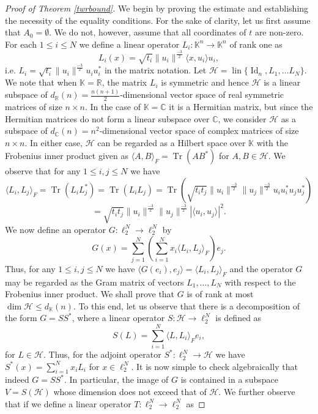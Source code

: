 \documentclass[12pt, reqno]{amsart}
\theoremstyle{definition}
\theoremstyle{remark}
\numberwithin{equation}{section}
\DeclareMathOperator{\lin}{lin}
\DeclareMathOperator{\tr}{Tr}
\DeclareMathOperator{\id}{Id}
\begin{document}
\begin{proof}[Proof of Theorem \ref{twrbound}]
We begin by proving the estimate and establishing the necessity of the equality conditions. For the sake of clarity, let us first assume that $A_0=\emptyset$. We do not, however, assume that all coordinates of $t$ are non-zero. For each $1 \leq i \leq N$ we define a linear operator $L_i: \mathbb{K}^n \to \mathbb{K}^n$ of rank one as
$$L_i(x) = \sqrt{t_i} \|u_i\|^{\frac{-3}{2}} \langle x, u_i \rangle u_i,$$
i.e. $L_i = \sqrt{t_i} \|u_i\|^{\frac{-3}{2}} u_iu_i^{*}$ in the matrix notation. Let $\mathcal{H} = \lin \{\id_n, L_1, \ldots L_N \}$. We note that when $\mathbb K=\mathbb R$, the matrix $L_i$ is symmetric and hence $\mathcal{H}$ is a linear subspace of $d_{\mathbb{R}}(n)=\frac{n(n+1)}{2}$-dimensional vector space of real symmetric matrices of size $n \times n$. In the case of $\mathbb{K}=\mathbb{C}$ it is a Hermitian matrix, but since the Hermitian matrices do not form a linear subspace over $\mathbb{C}$, we consider $\mathcal{H}$ as a subspace of $d_{\mathbb{C}}(n)=n^2$-dimensional vector space of complex matrices of size $n \times n$. In either case, $\mathcal H$ can be regarded as a Hilbert space over $\mathbb{K}$ with the Frobenius inner product given as $\langle A, B \rangle_F = \tr(AB^*)$ for $A, B \in \mathcal{H}$. We observe that for any $1 \leq i, j \leq N$ we have
$$\langle L_i, L_j \rangle_F = \tr(L_iL^*_j) = \tr (L_iL_j) = \tr (\sqrt{t_it_j} \|u_i\|^{\frac{-3}{2}} \|u_j\|^{\frac{-3}{2}} u_iu_i^*u_ju_j^*)$$
$$=\sqrt{t_it_j}\|u_i\|^{\frac{-3}{2}} \|u_j\|^{\frac{-3}{2}} |\langle u_i, u_j \rangle |^2.$$
We now define an operator $G:\ell_2^N\to\ell_2^N$ by
$$G(x) = \sum_{j=1}^{N} \left ( \sum_{i=1}^{N} x_i \langle L_i, L_j \rangle_F \right ) e_j.$$
Thus, for any $1 \leq i, j \leq N$ we have $\langle G(e_i), e_j \rangle = \langle L_i, L_j \rangle_F$ and the operator $G$ may be regarded as the Gram matrix of vectors $L_1, \ldots, L_N$ with respect to the Frobenius inner product. We shall prove that $G$ is of rank at most $\dim \mathcal{H} \leq d_{\mathbb{K}}(n)$. To this end, let us observe that there is a decomposition of the form $G = SS^*$, where a linear operator $S: \mathcal{H} \to \ell_2^N$ is defined as
$$S(L) = \sum_{i=1}^{N} \langle L, L_i \rangle_F e_i,$$
for $L \in \mathcal{H}$.
Thus, for the adjoint operator $S^*: \ell_2^N \to \mathcal{H}$ we have $S^*(x) = \sum_{i=1}^{N} x_i L_i$ for $x \in \ell_2^N$. It is now simple to check algebraically that indeed $G=SS^*$. In particular, the image of $G$ is contained in a subspace $V=S(\mathcal{H})$ whose dimension does not exceed that of $\mathcal H$. We further observe that if we define a linear operator $T: \ell_2^N \to \ell_2^N$ as

\end{proof}
\end{document}
